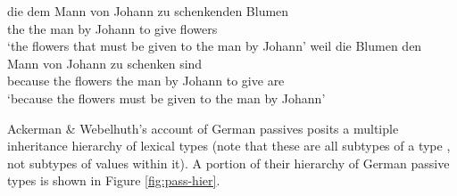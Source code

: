 \documentclass[output=paper
                ,modfonts
                ,nonflat
	        ,collection
	        ,collectionchapter
	        ,collectiontoclongg
 	        ,biblatex
                ,babelshorthands
                ,newtxmath
                ,draftmode
                ,colorlinks, citecolor=brown
]{./langsci/langscibook}
\begin{document}
{\begin{exe}
	\ex\label{zu-pass}
	\begin{xlist}
		\ex\label{zu-pass-a}
		\gll die dem Mann von Johann zu schenkenden Blumen \\
		the the man by Johann to give flowers  \\
		\glt `the flowers that must be given to the man by Johann'
		\ex\label{zu-pass-b}
		\gll weil die Blumen den Mann von Johann zu schenken sind \\
		because the flowers the man by Johann to give are \\
		\glt `because the flowers must be given to the man by Johann'
	\end{xlist}
\end{exe}

Ackerman \& Webelhuth's account of German passives posits a multiple inheritance hierarchy of lexical types (note that these are all subtypes of a type , not subtypes of values within it). A portion of their hierarchy of German passive types is shown in Figure \ref{fig:pass-hier}.


}
\end{document}
